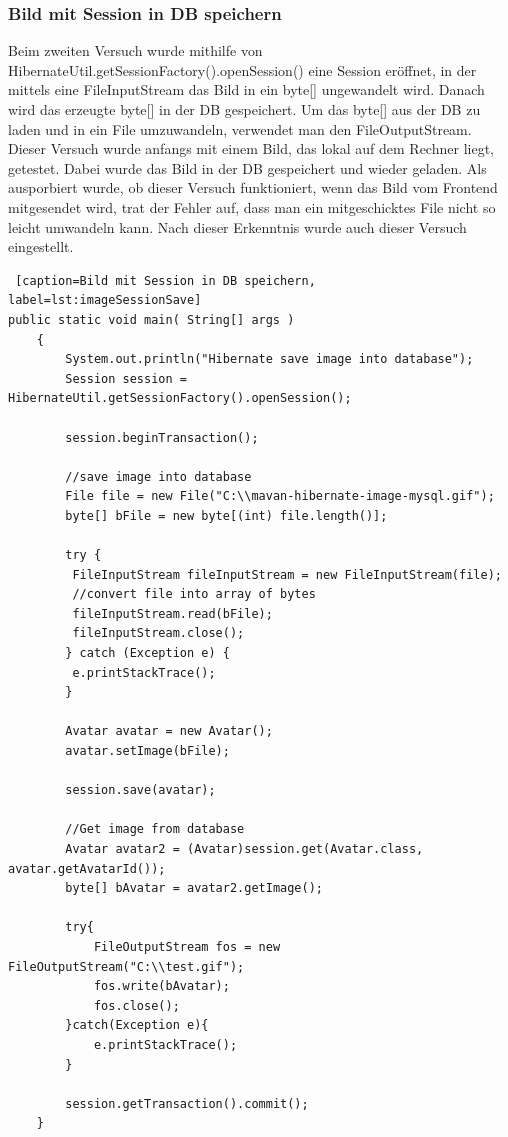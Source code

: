 \subsubsection{Bild mit Session in DB speichern}
Beim zweiten Versuch wurde mithilfe von HibernateUtil.getSessionFactory().openSession() eine Session eröffnet,
in der mittels eine FileInputStream das Bild in ein byte[] ungewandelt wird. Danach wird das erzeugte byte[] 
in der DB gespeichert. Um das byte[] aus der DB zu laden und in ein File umzuwandeln, verwendet man den
FileOutputStream.
\newline
\newline
Dieser Versuch wurde anfangs mit einem Bild, das lokal auf dem Rechner liegt, getestet. Dabei wurde das Bild
in der DB gespeichert und wieder geladen. Als ausporbiert wurde, ob dieser Versuch funktioniert, wenn das Bild
vom Frontend mitgesendet wird, trat der Fehler auf, dass man ein mitgeschicktes File nicht so leicht umwandeln kann.
Nach dieser Erkenntnis wurde auch dieser Versuch eingestellt.

\begin{lstlisting} [caption=Bild mit Session in DB speichern, label=lst:imageSessionSave]
public static void main( String[] args )
    {
        System.out.println("Hibernate save image into database");
        Session session = HibernateUtil.getSessionFactory().openSession();
        
        session.beginTransaction();
        
        //save image into database
        File file = new File("C:\\mavan-hibernate-image-mysql.gif");
        byte[] bFile = new byte[(int) file.length()];
        
        try {
         FileInputStream fileInputStream = new FileInputStream(file);
         //convert file into array of bytes
         fileInputStream.read(bFile);
         fileInputStream.close();
        } catch (Exception e) {
         e.printStackTrace();
        }
        
        Avatar avatar = new Avatar();
        avatar.setImage(bFile);
        
        session.save(avatar);
        
        //Get image from database
        Avatar avatar2 = (Avatar)session.get(Avatar.class, avatar.getAvatarId());
        byte[] bAvatar = avatar2.getImage();
        
        try{
            FileOutputStream fos = new FileOutputStream("C:\\test.gif"); 
            fos.write(bAvatar);
            fos.close();
        }catch(Exception e){
            e.printStackTrace();
        }

        session.getTransaction().commit();
    }
\end{lstlisting}

